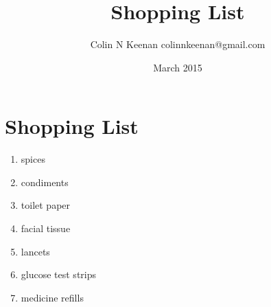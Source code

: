 \documentclass[12pt,letterpaper]{article}
\newcommand{\mytitle}{Shopping List}
\begin{document}
\title{\mytitle{}}
\author{Colin N Keenan colinnkeenan@gmail.com}
\date{March 2015}
\section*{\mytitle{}}
\begin{enumerate}
	\item spices
	\item condiments
	\item toilet paper
	\item facial tissue
	\item lancets
	\item glucose test strips
	\item medicine refills
\end{enumerate}
\end{document}
